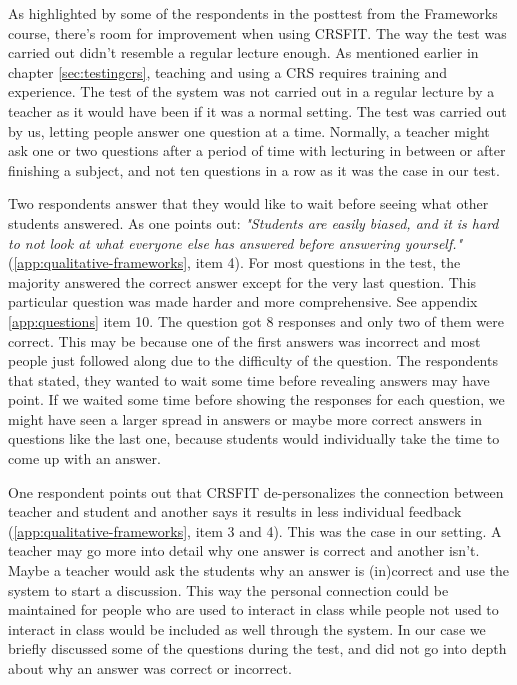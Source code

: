 As highlighted by some of the respondents in the posttest from the Frameworks course, there's room for improvement when using CRSFIT. The way the test was carried out didn't resemble a regular lecture enough. As mentioned earlier in chapter \ref{sec:testingcrs}, teaching and using a CRS requires training and experience. The test of the system was not carried out in a regular lecture by a teacher as it would have been if it was a normal setting. The test was carried out by us, letting people answer one question at a time. Normally, a teacher might ask one or two questions after a period of time with lecturing in between or after finishing a subject, and not ten questions in a row as it was the case in our test.

Two respondents answer that they would like to wait before seeing what other students answered. As one points out: \emph{"Students are easily biased, and it is hard to not look at what everyone else has answered before answering yourself."} (\ref{app:qualitative-frameworks}, item 4). For most questions in the test, the majority answered the correct answer except for the very last question. This particular question was made harder and more comprehensive. See appendix \ref{app:questions} item 10. The question got 8 responses and only two of them were correct. This may be because one of the first answers was incorrect and most people just followed along due to the difficulty of the question. The respondents that stated, they wanted to wait some time before revealing answers may have point. If we waited some time before showing the responses for each question, we might have seen a larger spread in answers or maybe more correct answers in questions like the last one, because students would individually take the time to come up with an answer. 

One respondent points out that CRSFIT de-personalizes the connection between teacher and student and another says it results in less individual feedback (\ref{app:qualitative-frameworks}, item 3 and 4). This was the case in our setting. A teacher may go more into detail why one answer is correct and another isn't. Maybe a teacher would ask the students why an answer is (in)correct and use the system to start a discussion. This way the personal connection could be maintained for people who are used to interact in class while people not used to interact in class would be included as well through the system. In our case we briefly discussed some of the questions during the test, and did not go into depth about why an answer was correct or incorrect.

